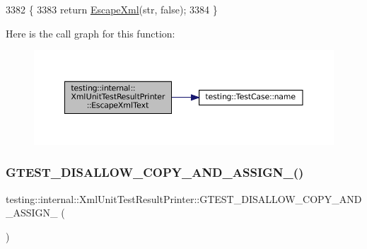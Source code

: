 \begin{DoxyCode}
3382                                                   \{
3383     \textcolor{keywordflow}{return} \hyperlink{classtesting_1_1internal_1_1XmlUnitTestResultPrinter_adadf42cf46ade9b26743466ce4b52f36}{EscapeXml}(str, \textcolor{keyword}{false});
3384   \}
\end{DoxyCode}
Here is the call graph for this function\+:
\nopagebreak
\begin{figure}[H]
\begin{center}
\leavevmode
\includegraphics[width=350pt]{classtesting_1_1internal_1_1XmlUnitTestResultPrinter_a934486bda28e7013f2d07520d5098a31_cgraph}
\end{center}
\end{figure}
\mbox{\label{classtesting_1_1internal_1_1XmlUnitTestResultPrinter_a2384a8c0cae7cbdf3debac145e43b323}} 
\subsubsection{\texorpdfstring{G\+T\+E\+S\+T\+\_\+\+D\+I\+S\+A\+L\+L\+O\+W\+\_\+\+C\+O\+P\+Y\+\_\+\+A\+N\+D\+\_\+\+A\+S\+S\+I\+G\+N\+\_\+()}{GTEST\_DISALLOW\_COPY\_AND\_ASSIGN\_()}}
{\footnotesize\ttfamily testing\+::internal\+::\+Xml\+Unit\+Test\+Result\+Printer\+::\+G\+T\+E\+S\+T\+\_\+\+D\+I\+S\+A\+L\+L\+O\+W\+\_\+\+C\+O\+P\+Y\+\_\+\+A\+N\+D\+\_\+\+A\+S\+S\+I\+G\+N\+\_\+ (\begin{DoxyParamCaption}\item[{\hyperlink{classtesting_1_1internal_1_1XmlUnitTestResultPrinter}{Xml\+Unit\+Test\+Result\+Printer}}]{ }\end{DoxyParamCaption})\hspace{0.3cm}{\ttfamily [private]}}

